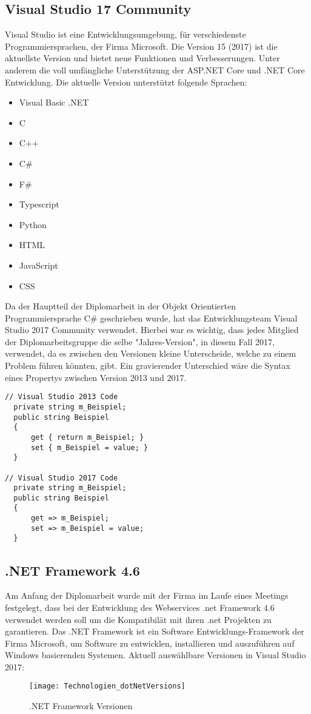 \subsection{Visual Studio 17 Community}
\label{sec:VisualStudio17Community}
Visual Studio ist eine Entwicklungsumgebung, für verschiedenste Programmiersprachen, der Firma Microsoft. Die Version 15 (2017) ist die aktuellste Version und bietet neue Funktionen und Verbesserungen. Unter anderem die voll umfängliche Unterstützung der ASP.NET Core und .NET Core Entwicklung. Die aktuelle Version unterstützt folgende Sprachen:
\begin{itemize}
\item Visual Basic .NET
\item C
\item C++
\item C\#
\item F\#
\item Typescript
\item Python
\item HTML
\item JavaScript
\item CSS
\end{itemize}
Da der Hauptteil der Diplomarbeit in der Objekt Orientierten Programmiersprache C\# geschrieben wurde, hat das Entwicklungsteam Visual Studio 2017 Community verwendet. Hierbei war es wichtig, dass jedes Mitglied der Diplomarbeitsgruppe die selbe "Jahres-Version", in diesem Fall 2017, verwendet, da es zwischen den Versionen kleine Unterscheide, welche zu einem Problem führen könnten, gibt. Ein gravierender Unterschied wäre die Syntax eines Propertys zwischen Version 2013 und 2017. 
\begin{lstlisting}[caption=Syntax Unterschied: Property , label=lst:test]
// Visual Studio 2013 Code
  private string m_Beispiel;
  public string Beispiel
  {
      get { return m_Beispiel; }
      set { m_Beispiel = value; }
  }

// Visual Studio 2017 Code
  private string m_Beispiel;
  public string Beispiel
  {
      get => m_Beispiel;
      set => m_Beispiel = value;
  }
\end{lstlisting}

\subsection{.NET Framework 4.6}
\label{sec:.NETFramework4.6}
Am Anfang der Diplomarbeit wurde mit der Firma im Laufe eines Meetings festgelegt, dass bei der Entwicklung des Webservices .net Framework 4.6 verwendet werden soll um die Kompatibilät mit ihren .net Projekten zu garantieren.
Das .NET Framework ist ein Software Entwicklungs-Framework der Firma Microsoft, um Software zu entwicklen, installieren und auszuführen auf Windows basierenden Systemen. 
Aktuell auswählbare Versionen in Visual Studio 2017:\\ 
\begin{figure}[H]
	\centering
    \texttt{[image: Technologien\_dotNetVersions]}
    \caption{.NET Framework Versionen}
    \label{fig:netFramework}
\end{figure}
\justifying
